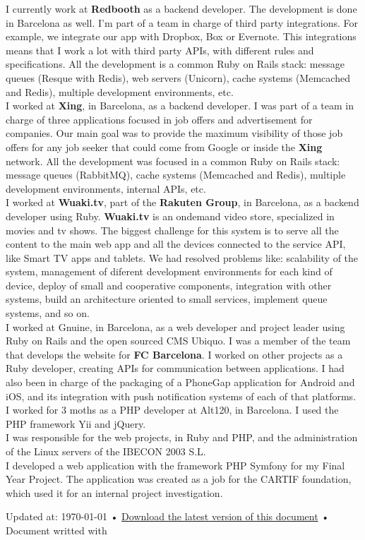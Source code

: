 \documentclass[10pt, a4paper]{article}
\begin{document}
\noindent{} I currently work at \textbf{Redbooth} as a backend developer. The development is done in Barcelona as well. I'm part of a team in charge of third party integrations. For example, we integrate our app with Dropbox, Box or Evernote. This integrations means that I work a lot with third party APIs, with different rules and specifications. All the development is a common Ruby on Rails stack: message queues (Resque with Redis), web servers (Unicorn), cache systems (Memcached and Redis), multiple development environments, etc.\\[.2cm]
\noindent{} I worked at \textbf{Xing}, in Barcelona, as a backend developer. I was part of a team in charge of three applications focused in job offers and advertisement for companies. Our main goal was to provide the maximum visibility of those job offers for any job seeker that could come from Google or inside the \textbf{Xing} network. All the development was focused in a common Ruby on Rails stack: message queues (RabbitMQ), cache systems (Memcached and Redis), multiple development environments, internal APIs, etc.\\[.2cm]
\noindent{} I worked at \textbf{Wuaki.tv}, part of the \textbf{Rakuten Group}, in Barcelona, as a backend developer using Ruby. \textbf{Wuaki.tv} is an ondemand video store, specialized in movies and tv shows. The biggest challenge for this system is to serve all the content to the main web app and all the devices connected to the service API, like Smart TV apps and tablets. We had resolved problems like: scalability of the system, management of diferent development environments for each kind of device, deploy of small and cooperative components, integration with other systems, build an architecture oriented to small services, implement queue systems, and so on.\\[.2cm]
\noindent{} I worked at Gnuine, in Barcelona, as a web developer and project leader using Ruby on Rails and the open sourced CMS Ubiquo. I was a member of the team that develops the website for \textbf{FC Barcelona}. I worked on other projects as a Ruby developer, creating APIs for communication between applications. I had also been in charge of the packaging of a PhoneGap application for Android and iOS, and its integration with push notification systems of each of that platforms.\\[.2cm]
\noindent{} I worked for 3 moths as a PHP developer at Alt120, in Barcelona. I used the PHP framework Yii and jQuery.\\[.2cm]
\noindent{} I was responsible for the web projects, in Ruby and PHP, and the administration of the Linux servers of the IBECON 2003 S.L.\\[.2cm]
\noindent{} I developed a web application with the framework PHP Symfony for my Final Year Project. The application was created as a job for the CARTIF foundation, which used it for an internal project investigation.


\begin{center}
{\scriptsize  Updated at: \today\- •\- \href{https://raw.github.com/jhbabon/cv/master/cv_en.pdf}{Download the latest version of this document}\- •\- Document writted with \href{http://nitens.org/taraborelli/cvtex}{\XeTeX}}
\end{center}
\end{document}

